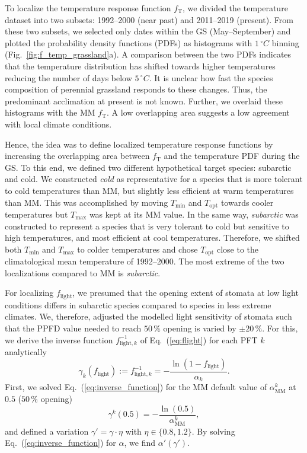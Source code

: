 \documentclass[bg, manuscript]{copernicus}
\begin{document}
To localize the temperature response function $f_\mathrm{T}$, we divided the temperature dataset into two subsets: 1992--2000 (near past) and 2011--2019 (present). From these two subsets, we selected only dates within the GS (May--September) and plotted the probability density functions (PDFs) as histograms with $1\,\unit{^\circ C}$ binning (Fig.~\ref{fig:f_temp_grassland}a). A comparison between the two PDFs indicates that the temperature distribution has shifted towards higher temperatures reducing the number of days below $5\,\unit{^\circ C}$. It is unclear how fast the species composition of perennial grassland responds to these changes. Thus, the predominant acclimation at present is not known. Further, we overlaid these histograms with the MM $f_\mathrm{T}$. A low overlapping area suggests a low agreement with local climate conditions. 

Hence, the idea was to define localized temperature response functions by increasing the overlapping area between $f_\mathrm{T}$ and the temperature PDF during the GS. To this end, we defined two different hypothetical target species: subarctic and cold. We constructed \emph{cold} as representative for a species that is more tolerant to cold temperatures than MM, but slightly less efficient at warm temperatures than MM. This was accomplished by moving $T_\mathrm{min}$ and $T_\mathrm{opt}$ towards cooler temperatures but $T_\mathrm{max}$ was kept at its MM value. In the same way, \emph{subarctic} was constructed to represent a species that is very tolerant to cold but sensitive to high temperatures, and most efficient at cool temperatures. Therefore, we shifted both $T_\mathrm{min}$ and $T_\mathrm{max}$ to colder temperatures and chose $T_\mathrm{opt}$ close to the climatological mean temperature of 1992--2000. The most extreme of the two localizations compared to MM is \emph{subarctic}.

For localizing $f_\mathrm{light}$, we presumed that the opening extent of stomata at low light conditions differs in subarctic species compared to species in less extreme climates. We, therefore, adjusted the modelled light sensitivity of stomata such that the PPFD value needed to reach $50\,\unit{\%}$ opening is varied by $\pm 20\,\unit{\%}$. For this, we derive the inverse function $f_{\mathrm{light},k}^{-1}$ of Eq.~(\ref{eq:flight}) for each PFT $k$ analytically
%
\begin{equation}
  \gamma_k(f_\mathrm{light}) := f_{\mathrm{light}, k}^{-1} = -\frac{\ln(1-f_\mathrm{light})}{\alpha_k}.
  \label{eq:inverse_function}
\end{equation}
%
First, we solved Eq.~(\ref{eq:inverse_function}) for the MM default value of $\alpha_\mathrm{MM}^k$ at $0.5$ ($50\,\%$ opening)
\begin{equation}
  \gamma^k(0.5) = -\frac{\ln(0.5)}{\alpha_\mathrm{MM}^k},
  \label{eq:inverse_function_halfway}
\end{equation}
and defined a variation $\gamma' = \gamma \cdot \eta$ with $\eta \in \{0.8, 1.2\}$. By solving Eq.~(\ref{eq:inverse_function}) for $\alpha$, we find $\alpha'(\gamma')$. 
\end{document}
